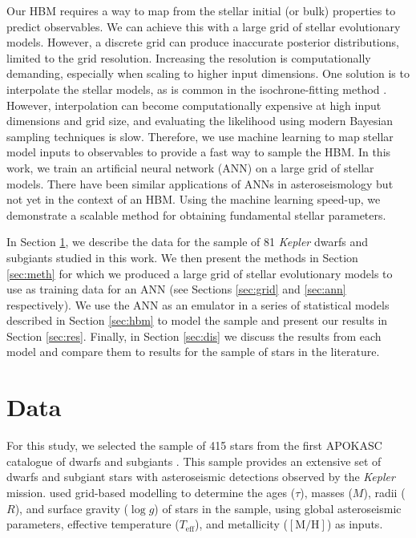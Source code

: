 \documentclass[a4paper,fleqn,usenatbib]{mnras}
\newcommand{\metallicity}{\ensuremath{[\mathrm{M}/\mathrm{H}]}}
\newcommand{\teff}{\ensuremath{T_\mathrm{eff}}}
\begin{document}
Our HBM requires a way to map from the stellar initial (or bulk) properties to predict observables. We can achieve this with a large grid of stellar evolutionary models. However, a discrete grid can produce inaccurate posterior distributions, limited to the grid resolution. Increasing the resolution is computationally demanding, especially when scaling to higher input dimensions. One solution is to interpolate the stellar models, as is common in the isochrone-fitting method \citep[see e.g.][]{Berger.Huber.ea2020}. However, interpolation can become computationally expensive at high input dimensions and grid size, and evaluating the likelihood using modern Bayesian sampling techniques is slow. Therefore, we use machine learning to map stellar model inputs to observables to provide a fast way to sample the HBM. In this work, we train an artificial neural network (ANN) on a large grid of stellar models. There have been similar applications of ANNs in asteroseismology \citep{Verma.Hanasoge.ea2016, Bellinger.Angelou.ea2016, Hon.Stello.ea2017, Hon.Stello.ea2018a, Hendriks.Aerts2019} but not yet in the context of an HBM. Using the machine learning speed-up, we demonstrate a scalable method for obtaining fundamental stellar parameters.

In Section \ref{sec:data}, we describe the data for the sample of 81 \emph{Kepler} dwarfs and subgiants studied in this work. We then present the methods in Section \ref{sec:meth} for which we produced a large grid of stellar evolutionary models to use as training data for an ANN (see Sections \ref{sec:grid} and \ref{sec:ann} respectively). We use the ANN as an emulator in a series of statistical models described in Section \ref{sec:hbm} to model the sample and present our results in Section \ref{sec:res}. Finally, in Section \ref{sec:dis} we discuss the results from each model and compare them to results for the sample of stars in the literature.

\section{Data}\label{sec:data}


For this study, we selected the sample of 415 stars from the first APOKASC catalogue of dwarfs and subgiants \citep[][hereafter ]{Serenelli.Johnson.ea2017}. This sample provides an extensive set of dwarfs and subgiant stars with asteroseismic detections observed by the \emph{Kepler} mission.  used grid-based modelling to determine the ages ($\tau$), masses ($M$), radii ($R$), and surface gravity ($\log g$) of stars in the sample, using global asteroseismic parameters, effective temperature ($\teff$), and metallicity ($\metallicity$) as inputs. 
\end{document}
